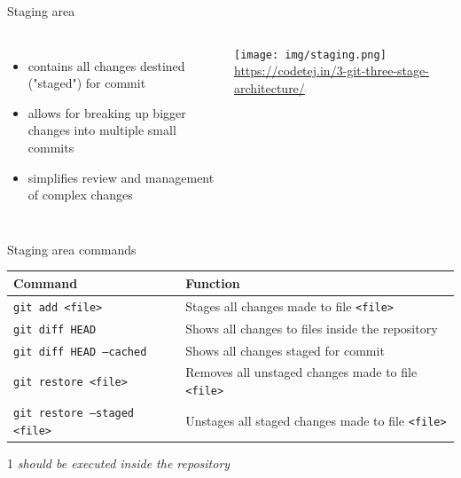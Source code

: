 \documentclass[10pt, graphics, aspectratio=169, table]{beamer}
\begin{document}
    \begin{frame}{Staging area}
        \begin{columns}
                \begin{itemize}
                    \item contains all changes destined ("staged") for commit
                    \item allows for breaking up bigger changes into multiple small commits
                    \item simplifies review and management of complex changes
                \end{itemize}
                \center\texttt{[image: img/staging.png]}
                \center\tiny\url{https://codetej.in/3-git-three-stage-architecture/}
        \end{columns}
    \end{frame}

    \begin{frame}{Staging area commands}
        \begin{table}
            \centering
            \begin{threeparttable}
                \begin{tabular}{ll}
                    \toprule
                    Command & Function \\
                    \midrule
                    \texttt{git add <file>} & Stages all changes made to file \texttt{<file>}\tnote{1} \\
                    \texttt{git diff HEAD} & Shows all changes to files inside the repository\tnote{1} \\
                    \texttt{git diff HEAD --cached} & Shows all changes staged for commit\tnote{1} \\
                    \texttt{git restore <file>} & Removes all unstaged changes made to file \texttt{<file>}\tnote{1}\\
                    \texttt{git restore --staged <file>} & Unstages all staged changes made to file \texttt{<file>}\tnote{1}\\
                    \bottomrule
                \end{tabular}
                \begin{tablenotes}
                    \item [1]\emph{should be executed inside the repository}
                \end{tablenotes}
            \end{threeparttable}
        \end{table}
    \end{frame}
\end{document}
